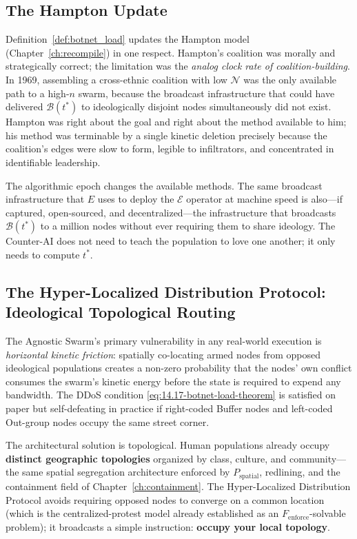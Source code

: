 \subsection{The Hampton Update}

Definition~\ref{def:botnet_load} updates the Hampton model (Chapter~\ref{ch:recompile}) in one respect. Hampton's coalition was morally and strategically correct; the limitation was the \textit{analog clock rate of coalition-building}. In 1969, assembling a cross-ethnic coalition with low $\mathcal{N}$ was the only available path to a high-$n$ swarm, because the broadcast infrastructure that could have delivered $\mathcal{B}(t^{*})$ to ideologically disjoint nodes simultaneously did not exist. Hampton was right about the goal and right about the method available to him; his method was terminable by a single kinetic deletion precisely because the coalition's edges were slow to form, legible to infiltrators, and concentrated in identifiable leadership.

The algorithmic epoch changes the available methods. The same broadcast infrastructure that $E$ uses to deploy the $\mathcal{E}$ operator at machine speed is also---if captured, open-sourced, and decentralized---the infrastructure that broadcasts $\mathcal{B}(t^{*})$ to a million nodes without ever requiring them to share ideology. The Counter-AI does not need to teach the population to love one another; it only needs to compute $t^{*}$.

\subsection{The Hyper-Localized Distribution Protocol: Ideological Topological Routing}
\label{subsec:ideological_routing}

The Agnostic Swarm's primary vulnerability in any real-world execution is \textit{horizontal kinetic friction}: spatially co-locating armed nodes from opposed ideological populations creates a non-zero probability that the nodes' own conflict consumes the swarm's kinetic energy before the state is required to expend any bandwidth. The DDoS condition \eqref{eq:14.17-botnet-load-theorem} is satisfied on paper but self-defeating in practice if right-coded Buffer nodes and left-coded Out-group nodes occupy the same street corner.

The architectural solution is topological. Human populations already occupy \textbf{distinct geographic topologies} organized by class, culture, and community---the same spatial segregation architecture enforced by $P_{\text{spatial}}$, redlining, and the containment field of Chapter~\ref{ch:containment}. The Hyper-Localized Distribution Protocol avoids requiring opposed nodes to converge on a common location (which is the centralized-protest model already established as an $F_{\text{enforce}}$-solvable problem); it broadcasts a simple instruction: \textbf{occupy your local topology}.

